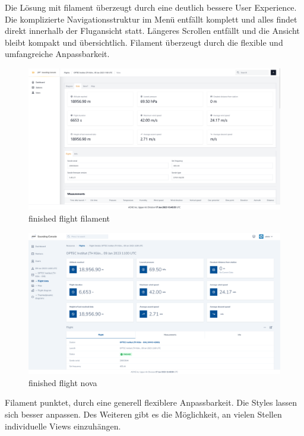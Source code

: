Die Lösung mit filament überzeugt durch eine deutlich bessere User Experience.
Die komplizierte Navigationsstruktur im Menü entfällt komplett und alles findet direkt innerhalb der Flugansicht statt.
Längeres Scrollen entfällt und die Ansicht bleibt kompakt und übersichtlich.
Filament überzeugt durch die flexible und umfangreiche Anpassbarkeit.

\begin{figure}[h!]
    \centering
    \caption{finished flight filament}
    \label{fig:finished_flight_filament}
    \includegraphics[scale=0.30]{assets/finished_flight_filament}
\end{figure}

\begin{figure}[h!]
    \centering
    \caption{finished flight nova}
    \label{fig:finished_flight_nova}
    \includegraphics[scale=0.30]{assets/finished_flight_nova}
\end{figure}

Filament punktet, durch eine generell flexiblere Anpassbarkeit.
Die Styles lassen sich besser anpassen.
Des Weiteren gibt es die Möglichkeit, an vielen Stellen individuelle Views einzuhängen.

